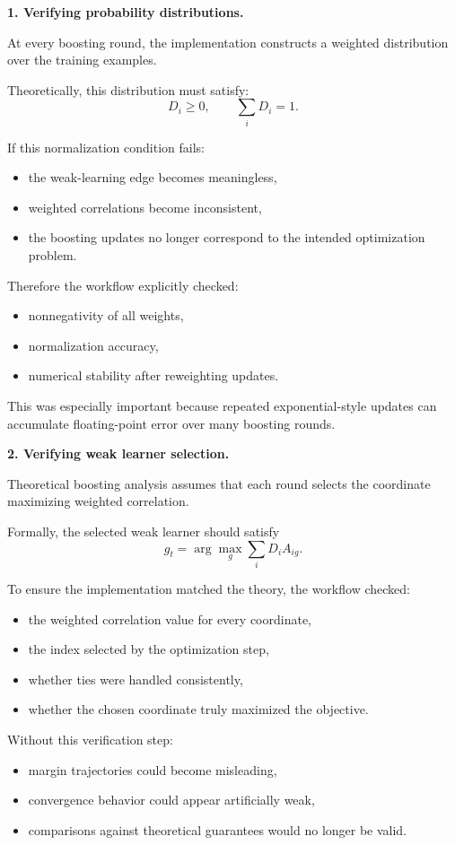 \documentclass[11pt]{article}
\begin{document}
\begin{enumerate}
\begin{solutionbox}
\bigskip

\textbf{1. Verifying probability distributions.}

At every boosting round, the implementation constructs a weighted distribution over the training examples.

Theoretically, this distribution must satisfy:
\[
D_i\ge0,
\qquad
\sum_iD_i=1.
\]

If this normalization condition fails:
\begin{itemize}
    \item the weak-learning edge becomes meaningless,
    \item weighted correlations become inconsistent,
    \item the boosting updates no longer correspond to the intended optimization problem.
\end{itemize}

Therefore the workflow explicitly checked:
\begin{itemize}
    \item nonnegativity of all weights,
    \item normalization accuracy,
    \item numerical stability after reweighting updates.
\end{itemize}

This was especially important because repeated exponential-style updates can accumulate floating-point error over many boosting rounds.

\medskip

\textbf{2. Verifying weak learner selection.}

Theoretical boosting analysis assumes that each round selects the coordinate maximizing weighted correlation.

Formally, the selected weak learner should satisfy
\[
g_t
=
\arg\max_g
\sum_iD_iA_{ig}.
\]

To ensure the implementation matched the theory, the workflow checked:
\begin{itemize}
    \item the weighted correlation value for every coordinate,
    \item the index selected by the optimization step,
    \item whether ties were handled consistently,
    \item whether the chosen coordinate truly maximized the objective.
\end{itemize}

Without this verification step:
\begin{itemize}
    \item margin trajectories could become misleading,
    \item convergence behavior could appear artificially weak,
    \item comparisons against theoretical guarantees would no longer be valid.
\end{itemize}


\end{solutionbox}
\end{enumerate}
\end{document}
